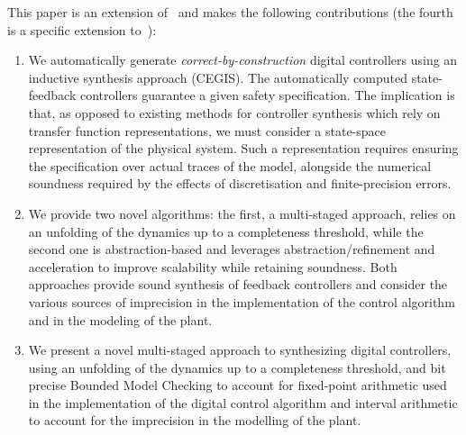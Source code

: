 \documentclass[twocolumn]{autart}    %
\newcommand{\addtodo}[1]{\textcolor{red}{[#1]}}
\renewcommand{\note}[1]{\textcolor{red}{[#1]}}
\begin{document}
This paper is an extension of~\cite{DBLP:conf/cav/AbateBCCDKKP17}
and makes the following contributions (the fourth is a 
specific extension to~\cite{DBLP:conf/cav/AbateBCCDKKP17}): 
%
\begin{enumerate}

\item We automatically generate \emph{correct-by-construction} digital
  controllers using an inductive synthesis approach (CEGIS).  
  The automatically computed state-feedback
  controllers guarantee a given safety specification.
  The implication is that, as opposed to existing
  methods for controller synthesis which rely on transfer function
  representations, we must consider a state-space representation of
  the physical system. Such a representation requires ensuring the
  specification over actual traces of the model, alongside the
  numerical soundness required by the effects of discretisation and
  finite-precision errors.

  
\ifx\axelerator
\item We provide two novel algorithms: the first, a multi-staged approach, relies on 
  an unfolding of the dynamics up to a completeness threshold, while the
  second one is abstraction-based and leverages abstraction/refinement and
  acceleration to improve scalability while retaining soundness.  %
  Both approaches provide sound synthesis of 
  feedback controllers and consider the various sources of imprecision in
  the implementation of the control algorithm and in the modeling of the
  plant. 
\else  
\item We present a novel multi-staged approach to synthesizing digital controllers, using 
  an unfolding of the dynamics up to a completeness threshold, and bit precise Bounded Model
  Checking to account for fixed-point arithmetic used in the implementation of the digital control algorithm
  and interval arithmetic to account for the imprecision in the modelling of the plant. 
  \fi
  

\end{enumerate}
\end{document}
